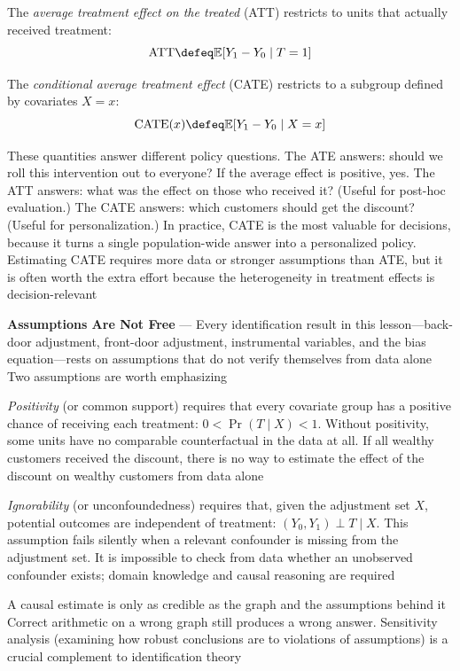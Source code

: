 The \emph{average treatment effect on the treated} (ATT) restricts to units that
actually received treatment:
\begin{equation}
  \text{ATT}\defeq \mathbb{E}[Y_{1}- Y_{0}\mid T = 1] \label{eq:att}
\end{equation}

The \emph{conditional average treatment effect} (CATE) restricts to a subgroup defined
by covariates $X = x$:
\begin{equation}
  \text{CATE}(x) \defeq \mathbb{E}[Y_{1}- Y_{0}\mid X = x] \label{eq:cate}
\end{equation}

These quantities answer different policy questions. The ATE answers: should we roll
this intervention out to everyone? If the average effect is positive, yes. The
ATT answers: what was the effect on those who received it? (Useful for post-hoc evaluation.)
The CATE answers: which customers should get the discount? (Useful for
personalization.) In practice, CATE is the most valuable for decisions, because
it turns a single population-wide answer into a personalized policy. Estimating CATE
requires more data or stronger assumptions than ATE, but it is often worth the
extra effort because the heterogeneity in treatment effects is decision-relevant

\textbf{Assumptions Are Not Free} --- Every identification result in this
lesson—back-door adjustment, front-door adjustment, instrumental variables, and the
bias equation—rests on assumptions that do not verify themselves from data alone
Two assumptions are worth emphasizing

\emph{Positivity} (or common support) requires that every covariate group has a
positive chance of receiving each treatment: $0 < \Pr(T \mid X) < 1$. Without
positivity, some units have no comparable counterfactual in the data at all. If
all wealthy customers received the discount, there is no way to estimate the effect
of the discount on wealthy customers from data alone

\emph{Ignorability} (or unconfoundedness) requires that, given the adjustment
set $X$, potential outcomes are independent of treatment:
$(Y_{0}, Y_{1}) \perp T \mid X$. This assumption fails silently when a relevant confounder
is missing from the adjustment set. It is impossible to check from data whether
an unobserved confounder exists; domain knowledge and causal reasoning are required

A causal estimate is only as credible as the graph and the assumptions behind it
Correct arithmetic on a wrong graph still produces a wrong answer. Sensitivity analysis
(examining how robust conclusions are to violations of assumptions) is a crucial
complement to identification theory

